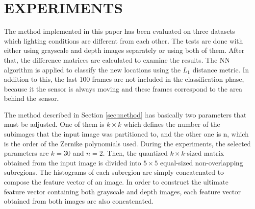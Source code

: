 \documentclass[]{spie}  %
\begin{document}
\section{EXPERIMENTS}

The method implemented in this paper has been evaluated on three datasets which lighting conditions are different from each other. The tests are done with either using grayscale and depth images separately or using both of them. After that, the difference matrices are calculated to examine the results. The NN algorithm is applied to classify the new locations using the $L_{1}$ distance metric. In addition to this, the last 100 frames are not included in the classification phase, because it the sensor is always moving and these frames correspond to the area behind the sensor.

The method described in Section \ref{sec:method} has basically two parameters that must be adjusted. One of them is $k\times k$ which defines the number of the subimages that the input image was partitioned to, and the other one is n, which is the order of the Zernike polynomials used. During the experiments, the selected parameters are $k = 30$ and $n = 2$. Then, the quantized $k\times k$-sized matrix obtained from the input image is divided into $5\times 5$ equal-sized non-overlapping subregions. The histograms of each subregion are simply concatenated to compose the feature vector of an image. In order to construct the ultimate feature vector containing both grayscale and depth images, each feature vector obtained from both images are also concatenated.
\end{document}
